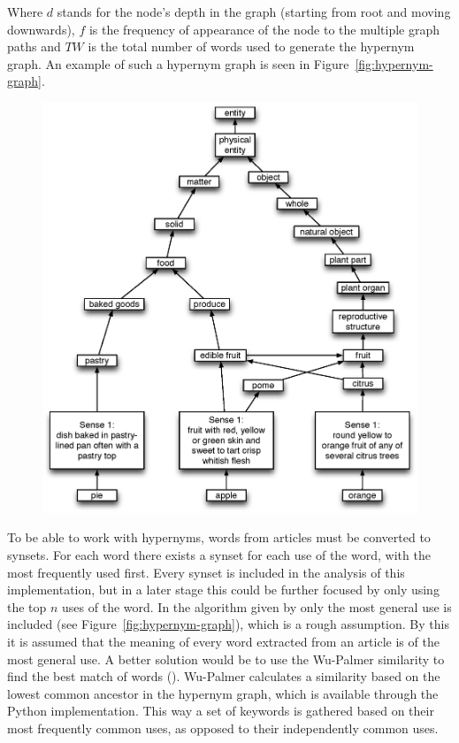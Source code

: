 Where $d$ stands for the node's depth in the graph (starting from root and moving downwards), $f$ is the frequency of appearance of the node to the multiple graph paths and $TW$ is the total number of words used to generate the hypernym graph. An example of such a hypernym graph is seen in Figure~\ref{fig:hypernym-graph}.
\begin{figure}[h!tp]
	\myfloatalign
		\includegraphics[width=.8\textwidth]{img/hypernym-graph}
\end{figure}

To be able to work with hypernyms, words from articles must be converted to synsets. For each word there exists a synset for each use of the word, with the most frequently used first. Every synset is included in the analysis of this implementation, but in a later stage this could be further focused by only using the top $n$ uses of the word. In the algorithm given by \cite{116262780379.pdf} only the most general use is included (see Figure~\ref{fig:hypernym-graph}), which is a rough assumption. By this it is assumed that the meaning of every word extracted from an article is of the most general use. A better solution would be to use the Wu-Palmer similarity to find the best match of words (\cite{Wu-Palmer}). Wu-Palmer calculates a similarity based on the lowest common ancestor in the hypernym graph, which is available through the Python implementation. This way a set of keywords is gathered based on their most frequently common uses, as opposed to their independently common uses.


